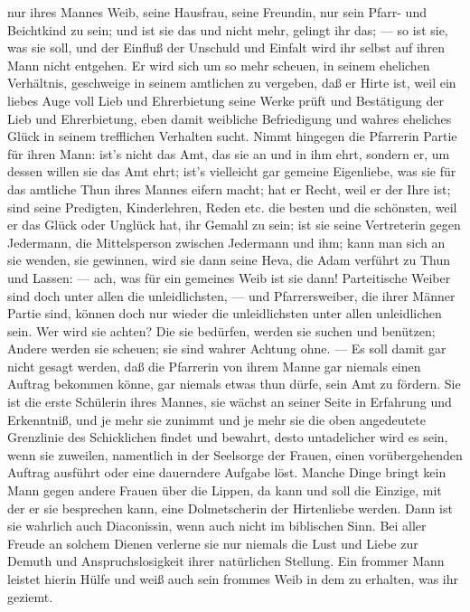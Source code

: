 nur ihres Mannes Weib, seine Hausfrau, seine Freundin, nur sein Pfarr- und Beichtkind zu sein; und ist sie das und nicht mehr, gelingt ihr das; — so ist sie, was sie soll, und der Einfluß der Unschuld und Einfalt wird ihr selbst auf ihren Mann nicht entgehen. Er wird sich um so mehr scheuen, in seinem ehelichen Verhältnis, geschweige in seinem amtlichen zu vergeben, daß er Hirte ist, weil ein liebes Auge voll Lieb und Ehrerbietung seine Werke prüft und Bestätigung der Lieb und Ehrerbietung, eben damit weibliche Befriedigung und wahres eheliches Glück in seinem trefflichen Verhalten sucht. Nimmt hingegen die Pfarrerin Partie für ihren Mann: ist’s nicht das Amt, das sie an und in ihm ehrt, sondern er, um dessen willen sie das Amt ehrt; ist’s vielleicht gar gemeine Eigenliebe, was sie für das amtliche Thun ihres Mannes eifern macht; hat er Recht, weil er der Ihre ist; sind seine Predigten, Kinderlehren, Reden etc. die besten und die schönsten, weil er das Glück oder Unglück hat, ihr Gemahl zu sein; ist sie seine Vertreterin gegen Jedermann, die Mittelsperson zwischen Jedermann und ihm; kann man sich an sie wenden, sie gewinnen, wird sie dann seine Heva, die Adam verführt zu Thun und Lassen: — ach, was für ein gemeines Weib ist sie dann! Parteitische Weiber sind doch unter allen die unleidlichsten, — und Pfarrersweiber, die ihrer Männer Partie sind, können doch nur wieder die unleidlichsten unter allen unleidlichen sein. Wer wird sie achten? Die sie bedürfen, werden sie suchen und benützen; Andere werden sie scheuen; sie sind wahrer Achtung ohne. — Es soll damit gar nicht gesagt werden, daß die Pfarrerin von ihrem
Manne gar niemals einen Auftrag bekommen könne, gar niemals etwas thun dürfe, sein Amt zu fördern. Sie ist die erste Schülerin ihres Mannes, sie wächst an seiner Seite in Erfahrung und Erkenntniß, und je mehr sie zunimmt und je mehr sie die oben angedeutete Grenzlinie des Schicklichen findet und bewahrt, desto untadelicher wird es sein, wenn sie zuweilen, namentlich in der Seelsorge der Frauen, einen vorübergehenden Auftrag ausführt oder eine dauerndere Aufgabe löst. Manche Dinge bringt kein Mann gegen andere Frauen über die Lippen, da kann und soll die Einzige, mit der er sie besprechen kann, eine Dolmetscherin der Hirtenliebe werden. Dann ist sie wahrlich auch Diaconissin, wenn auch nicht im biblischen Sinn. Bei aller Freude an solchem Dienen verlerne sie nur niemals die Lust und Liebe zur Demuth und Anspruchslosigkeit ihrer natürlichen Stellung. Ein frommer Mann leistet hierin Hülfe und weiß auch sein frommes Weib in dem zu erhalten, was ihr geziemt.

